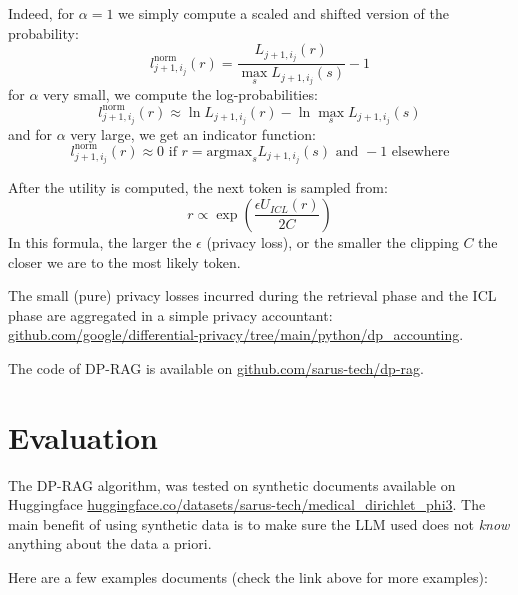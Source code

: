 \documentclass[
  12pt,
  a4paper,
]{article}
\begin{document}
Indeed, for \(\alpha=1\) we simply compute a scaled and shifted version
of the probability:
\[l_{j+1,i_{j}}^\text{norm}\left(r\right) = \frac{L_{j+1,i_{j}}\left(r\right)}{\max_s L_{j+1,i_{j}}\left(s\right)}-1\]
for \(\alpha\) very small, we compute the log-probabilities:
\[l_{j+1,i_{j}}^\text{norm}\left(r\right) \approx \ln L_{j+1,i_{j}}\left(r\right) - \ln \max_s L_{j+1,i_{j}}\left(s\right)\]
and for \(\alpha\) very large, we get an indicator function:
\[l_{j+1,i_{j}}^\text{norm}\left(r\right) \approx 0 \text{ if } r=\text{argmax}_s L_{j+1,i_{j}}\left(s\right) \text{ and } -1 \text{ elsewhere}\]

After the utility is computed, the next token is sampled from:
\[r\propto \exp{\left(\frac{\epsilon U_{ICL}(r)}{2 C}\right)}\] In this
formula, the larger the \(\epsilon\) (privacy loss), or the smaller the
clipping \(C\) the closer we are to the most likely token.

The small (pure) privacy losses incurred during the retrieval phase and
the ICL phase are aggregated in a simple privacy accountant:
\href{https://github.com/google/differential-privacy/tree/main/python/dp_accounting}{github.com/google/differential-privacy/tree/main/python/dp\_accounting}.

The code of DP-RAG is available on
\href{https://github.com/sarus-tech/dp-rag}{github.com/sarus-tech/dp-rag}.

\section{Evaluation}\label{evaluation}

The DP-RAG algorithm, was tested on synthetic documents available on
Huggingface
\href{https://huggingface.co/datasets/sarus-tech/medical_dirichlet_phi3}{huggingface.co/datasets/sarus-tech/medical\_dirichlet\_phi3}.
The main benefit of using synthetic data is to make sure the LLM used
does not \emph{know} anything about the data a priori.

Here are a few examples documents (check the link above for more
examples):
\end{document}
